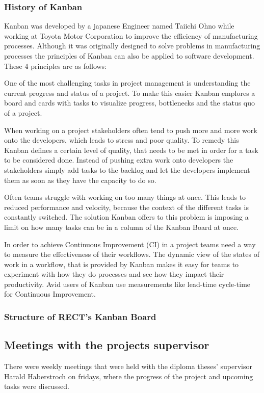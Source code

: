 \subsubsection{History of Kanban}
Kanban was developed by a japanese Engineer named Taiichi Ohno while working at Toyota Motor Corporation to improve the efficiency of manufacturing processes. Although it was originally
designed to solve problems in manufacturing processes the principles of Kanban can also be applied to software development. These 4 principles are as follows:

One of the most challenging tasks in project management is understanding the current progress and status of a project. To make this easier Kanban emplores a board and cards with tasks to
visualize progress, bottlenecks and the status quo of a project.

When working on a project stakeholders often tend to push more and more work onto the developers, which leads to stress and poor quality. To remedy this Kanban defines a certain level of
quality, that needs to be met in order for a task to be considered done. Instead of pushing extra work onto developers the stakeholders simply add tasks to the backlog and let the 
developers implement them as soon as they have the capacity to do so.

Often teams struggle with working on too many things at once. This leads to reduced performance and velocity, because the context of the different tasks is constantly switched. 
The solution Kanban offers to this problem is imposing a limit on how many tasks can be in a column of the Kanban Board at once. 

In order to achieve Continuous Improvement (CI) in a project teams need a way to measure the effectiveness of their workflows. The dynamic view of the states of work in a workflow, that is 
provided by Kanban makes it easy for teams to experiment with how they do processes and see how they impact their productivity. Avid users of Kanban use measurements like lead-time 
cycle-time \cite{cycle-time-lead-time} for Continuous Improvement.  

\subsubsection{Structure of RECT's Kanban Board}

\subsection{Meetings with the projects supervisor}
There were weekly meetings that were held with the diploma theses' supervisor Harald Haberstroch on fridays, where the progress of the project and upcoming tasks were discussed.

